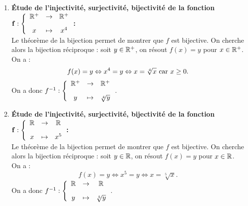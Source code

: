 \documentclass[a4paper, 11pt,reqno]{article}
\begin{document}
\begin{correction}
\begin{enumerate}
		      On a $f(x) = 1 \Leftrightarrow x^4=1 \Leftrightarrow x = -1$ ou $x=1$, donc $f$ n'est pas injective.
		      On a $f(x) =-1 \Leftrightarrow x^4=-1$ qui n'a pas de solution, donc $f$ n'est pas surjective. Donc $f$ n'est pas bijective.
		\item  \textbf{\'Etude de l'injectivit\'e, surjectivit\'e, bijectivit\'e de la fonction $\mathbf{f:\left\lbrace\begin{array}{ccc} \R^+&\rightarrow& \R^+\vsec\\ x & \mapsto & x^4\end{array}\right.}$:}\\
		      Le th\'eor\`eme de la bijection permet de montrer que $f$ est bijective. On cherche alors la bijection r\'eciproque : soit $y \in \mathbb{R}^+$, on r\'esout $f(x)=y$ pour $x \in \mathbb{R}^+$. On a :
		      $$f(x) = y \Leftrightarrow x^4= y \Leftrightarrow x=\sqrt[4]{x}  \textmd{ car } x \geq 0.$$
		      On a donc $f^{-1} : \left\lbrace\begin{array}{ccc} \R^+&\rightarrow& \R^+\vsec\\ y & \mapsto & \sqrt[4]{y} \end{array}\right.$.
		\item  \textbf{\'Etude de l'injectivit\'e, surjectivit\'e, bijectivit\'e de la fonction $\mathbf{f:\left\lbrace\begin{array}{ccc} \R&\rightarrow& \R\vsec\\ x & \mapsto & x^5\end{array}\right.}$:}\\
		      Le th\'eor\`eme de la bijection permet de montrer que $f$ est bijective. On cherche alors la bijection r\'eciproque :  soit $y \in \mathbb{R}$, on r\'esout $f(x)=y$ pour $x \in \mathbb{R}$. On a :
		      $$f(x) = y \Leftrightarrow x^5= y \Leftrightarrow x=\sqrt[5]{x}.$$
		      On a donc $f^{-1} : \left\lbrace\begin{array}{ccc} \R&\rightarrow& \R\vsec\\ y & \mapsto & \sqrt[5]{y} \end{array}\right.$.

\end{enumerate}
\end{correction}
\end{document}
